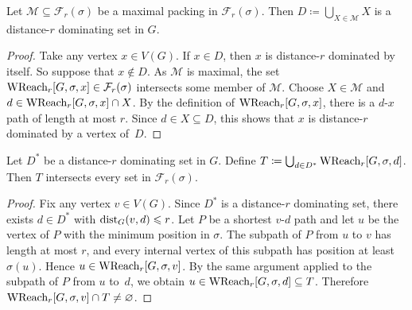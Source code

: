 \begin{lemma}\label{lem:apx-wreach-domination}
Let $\mathcal{M}\subseteq \mathcal{F}_r(\sigma)$ be a maximal packing in $\mathcal{F}_r(\sigma)$.
Then $D\coloneqq\bigcup_{X\in \mathcal{M}} X$ is a distance-$r$ dominating set in $G$.
\end{lemma}
\begin{proof}
Take any vertex $x\in V(G)$.
If $x\in D$, then $x$ is distance-$r$ dominated by itself.
So suppose that $x\notin D$.
As $\mathcal{M}$ is maximal, the set $\textrm{WReach}_r[G,\sigma,x]\in \mathcal{F}_r(\sigma)$ intersects some member of $\mathcal{M}$.
Choose $X\in \mathcal{M}$ and $d\in \textrm{WReach}_r[G,\sigma,x]\cap X$.
By the definition of $\textrm{WReach}_r[G,\sigma,x]$, there is a $d$-$x$ path of length at most $r$.
Since $d\in X\subseteq D$, this shows that $x$ is distance-$r$ dominated by a vertex of~$D$.
\end{proof}

\begin{lemma}\label{lem:apx-wreach-transversal}
Let $D^*$ be a distance-$r$ dominating set in $G$. Define $T\coloneqq\bigcup_{d\in D^*} \textrm{WReach}_r[G,\sigma,d]$.
Then $T$ intersects every set in $\mathcal{F}_r(\sigma)$.
\end{lemma}
\begin{proof}
Fix any vertex $v\in V(G)$.
Since $D^*$ is a distance-$r$ dominating set, there exists $d\in D^*$ with $\mathrm{dist}_G(v,d)\leqslant r$.
Let $P$ be a shortest $v$-$d$ path and let $u$ be the vertex of $P$ with the minimum position in $\sigma$.
The subpath of $P$ from $u$ to $v$ has length at most $r$, and every internal vertex of this subpath has position at least $\sigma(u)$.
Hence $u\in \textrm{WReach}_r[G,\sigma,v]$.
By the same argument applied to the subpath of $P$ from $u$ to~$d$, we obtain $u\in \textrm{WReach}_r[G,\sigma,d]\subseteq T$.
Therefore $\textrm{WReach}_r[G,\sigma,v]\cap T\neq \varnothing$.
\end{proof}

